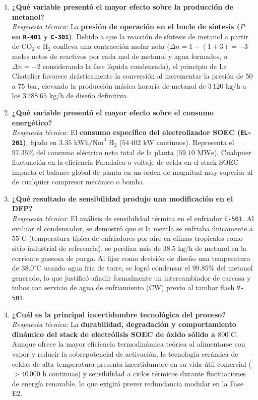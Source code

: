\documentclass[10pt,letterpaper]{article}
\begin{document}
\begin{enumerate}[leftmargin=*,itemsep=7pt]
    \item \textbf{¿Qué variable presentó el mayor efecto sobre la producción de metanol?}\\
    \textit{Respuesta técnica:} La \textbf{presión de operación en el bucle de síntesis ($P$ en \texttt{R-401} y \texttt{C-301})}. Debido a que la reacción de síntesis de metanol a partir de $\text{CO}_2$ e $\text{H}_2$ conlleva una contracción molar neta ($\Delta n = 1 - (1+3) = -3$ moles netos de reactivos por cada mol de metanol y agua formados, o $\Delta n = -2$ considerando la fase líquida condensada), el principio de Le Chatelier favorece drásticamente la conversión al incrementar la presión de $50$ a $75\text{ bar}$, elevando la producción másica horaria de metanol de $3\,120\text{ kg/h}$ a los $3\,788.65\text{ kg/h}$ de diseño definitivo.

    \item \textbf{¿Qué variable presentó el mayor efecto sobre el consumo energético?}\\
    \textit{Respuesta técnica:} El \textbf{consumo específico del electrolizador SOEC (\texttt{EL-201})}, fijado en $3.35\text{ kWh/Nm}^3\text{ H}_2$ ($54\,402\text{ kW}$ continuos). Representa el $\mathbf{97.35\%}$ del consumo eléctrico neto total de la planta ($59.10\text{ MWe}$). Cualquier fluctuación en la eficiencia Faradaica o voltaje de celda en el stack SOEC impacta el balance global de planta en un orden de magnitud muy superior al de cualquier compresor mecánico o bomba.

    \item \textbf{¿Qué resultado de sensibilidad produjo una modificación en el DFP?}\\
    \textit{Respuesta técnica:} El análisis de sensibilidad térmica en el enfriador \texttt{E-501}. Al evaluar el condensador, se demostró que si la mezcla se enfriaba únicamente a $55^\circ\text{C}$ (temperatura típica de enfriadores por aire en climas tropicales como sitio industrial de referencia), se perdían más de $38.5\text{ kg/h}$ de metanol en la corriente gaseosa de purga. Al fijar como decisión de diseño una temperatura de $38.0^\circ\text{C}$ usando agua fría de torre, se logró condensar el $99.85\%$ del metanol generado, lo que justificó añadir formalmente un intercambiador de carcasa y tubos con servicio de agua de enfriamiento (CW) previo al tambor flash \texttt{V-501}.

    \item \textbf{¿Cuál es la principal incertidumbre tecnológica del proceso?}\\
    \textit{Respuesta técnica:} La \textbf{durabilidad, degradación y comportamiento dinámico del stack de electrólisis SOEC de óxido sólido a $800^\circ\text{C}$}. Aunque ofrece la mayor eficiencia termodinámica teórica al alimentarse con vapor y reducir la sobrepotencial de activación, la tecnología cerámica de celdas de alta temperatura presenta incertidumbre en su vida útil comercial ($>40\,000\text{ h}$ continuas) y sensibilidad a ciclos térmicos durante fluctuaciones de energía renovable, lo que exigirá prever redundancia modular en la Fase E2.


\end{enumerate}
\end{document}
